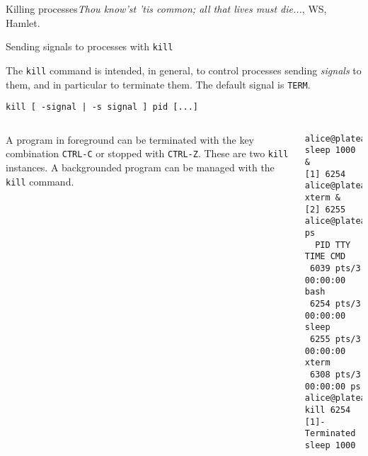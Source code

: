 \begin{frame}[t,fragile]{Killing processes}{\emph{Thou know'st 'tis common; all that lives must die...}, WS, Hamlet.}

\vspace{-0.25cm}
  \begin{block}{Sending signals to processes with  \alert{\texttt{kill}}}
    {\footnotesize
The \alert{\texttt{kill}} command is intended, in general, to control
processes sending \emph{signals} to them, and in particular to terminate them. The default signal is \texttt{TERM}.


      \begin{lstlisting}
kill [ -signal | -s signal ] pid [...]
      \end{lstlisting}
 
}
{\scriptsize

  \begin{columns}
       A program in foreground can
      be terminated with the key combination \alert{\texttt{CTRL-C}} or stopped
      with \alert{\texttt{CTRL-Z}}. These are two \texttt{kill}
      instances. A backgrounded program can be managed with the
      \texttt{kill} command.
        \hspace{-3cm}
        \begin{lstlisting}
alice@platea:~$ sleep 1000 &
[1] 6254
alice@platea:~$ xterm &
[2] 6255
alice@platea:~$ ps
  PID TTY          TIME CMD
 6039 pts/3    00:00:00 bash
 6254 pts/3    00:00:00 sleep
 6255 pts/3    00:00:00 xterm
 6308 pts/3    00:00:00 ps
alice@platea:~$ kill 6254
[1]-  Terminated         sleep 1000
        \end{lstlisting}
    \end{columns}
  }
  \end{block}
  
\end{frame}
